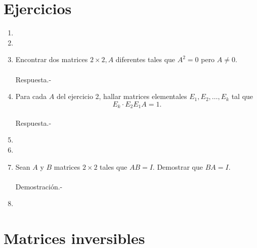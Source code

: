 \section{Ejercicios}

\begin{enumerate}[1.]

    \item 

    \item 

    \item Encontrar dos matrices $2\times 2,A$ diferentes tales que $A^2=0$ pero $A\neq 0.$\\\\
	Respuesta.-\;

    \item  Para cada $A$ del ejercicio 2, hallar matrices elementales $E_1,E_2,\ldots,E_k$ tal que 
	$$E_k\cdot E_2E_1A=1.$$\\
    Respuesta.-\;

    \item 

    \item 

    \item Sean $A$ y $B$ matrices $2\times 2$ tales que $AB=I$. Demostrar que $BA=I.$\\\\
	Demostración.-\;

    \item 

\end{enumerate}


\section{Matrices inversibles}
